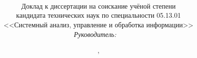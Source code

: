 \title{\normalsize{\textbf{\thesisTitle}}}

\author{
	\normalsize{\thesisAuthor} \\
	\vspace{18pt}
	\small{Доклад к диссертации на соискание учёной степени \\
		кандидата технических наук по специальности 05.13.01 \\
		<<Системный анализ, управление и обработка информации>>} \\
	\vspace{18pt}
	\small{\emph{Руководитель:}~\supervisorRegaliaShort~\supervisorFioShort}\\
}

\institute{\thesisOrganization}

\date{\thesisCity, \thesisYear}
